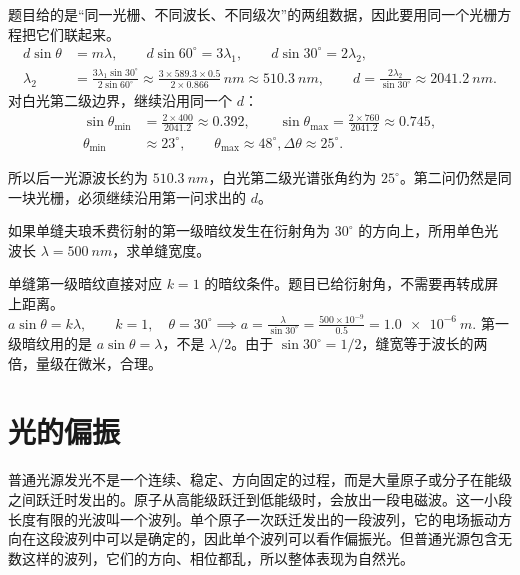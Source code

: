 \documentclass[lang=cn,11pt]{elegantbook}
\begin{document}
\begin{solution}
题目给的是“同一光栅、不同波长、不同级次”的两组数据，因此要用同一个光栅方程把它们联起来。
\[
\begin{aligned}
d\sin\theta&=m\lambda,\qquad
d\sin60^\circ=3\lambda_1,\qquad
d\sin30^\circ=2\lambda_2,\\
\lambda_2&=\frac{3\lambda_1\sin30^\circ}{2\sin60^\circ}
\approx \frac{3\times589.3\times0.5}{2\times0.866}\,\si{nm}
\approx \SI{510.3}{nm},\qquad
d=\frac{2\lambda_2}{\sin30^\circ}\approx \SI{2041.2}{nm}.
\end{aligned}
\]
对白光第二级边界，继续沿用同一个 \(d\)：
\[
\begin{aligned}
\sin\theta_{\min}&=\frac{2\times400}{2041.2}\approx0.392,\qquad
\sin\theta_{\max}=\frac{2\times760}{2041.2}\approx0.745,\\
\theta_{\min}&\approx23^\circ,\qquad
\theta_{\max}\approx48^\circ,
\Delta\theta\approx25^\circ.
\end{aligned}
\]

所以后一光源波长约为 \(\SI{510.3}{nm}\)，白光第二级光谱张角约为 \(25^\circ\)。第二问仍然是同一块光栅，必须继续沿用第一问求出的 \(d\)。
\end{solution}

\begin{exercise}
如果单缝夫琅禾费衍射的第一级暗纹发生在衍射角为 \(30^\circ\) 的方向上，所用单色光波长 \(\lambda=\SI{500}{nm}\)，求单缝宽度。
\end{exercise}

\begin{solution}
单缝第一级暗纹直接对应 \(k=1\) 的暗纹条件。题目已给衍射角，不需要再转成屏上距离。
 \(a\sin\theta=k\lambda,\qquad k=1,\quad \theta=30^\circ \implies a=\frac{\lambda}{\sin30^\circ} =\frac{500\times10^{-9}}{0.5} =\SI{1.0e-6}{m}.\) 
第一级暗纹用的是 \(a\sin\theta=\lambda\)，不是 \(\lambda/2\)。由于 \(\sin30^\circ=1/2\)，缝宽等于波长的两倍，量级在微米，合理。
\end{solution}

\chapter{光的偏振}

\begin{definition}
普通光源发光不是一个连续、稳定、方向固定的过程，而是大量原子或分子在能级之间跃迁时发出的。原子从高能级跃迁到低能级时，会放出一段电磁波。这一小段长度有限的光波叫一个波列。单个原子一次跃迁发出的一段波列，它的电场振动方向在这段波列中可以是确定的，因此单个波列可以看作偏振光。但普通光源包含无数这样的波列，它们的方向、相位都乱，所以整体表现为自然光。
\end{definition}
\end{document}
